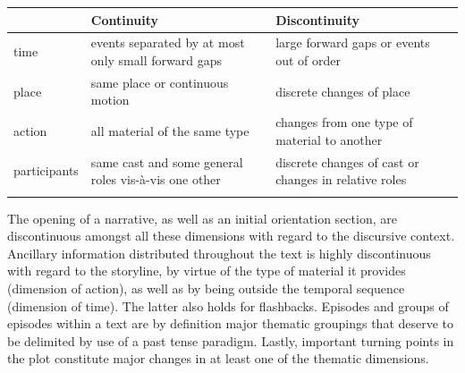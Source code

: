 \begin{table}[htb]
\begin{center}
\begin{tabularx}{\textwidth}{lXX}
\lsptoprule 
& \footnotesize{Continuity} & \footnotesize{Discontinuity}\\
\midrule
\footnotesize{time} & events separated by at most only small forward gaps & large forward gaps or events out of order\\
\footnotesize{place} & same place or continuous motion & discrete changes of place\\
\footnotesize{action} & all material of the same type & changes from one type of material to another \\
\footnotesize{participants} & same cast and some general roles vis-à-vis one other & discrete changes of cast or changes in relative roles\\
\lspbottomrule 
\end{tabularx}
\label{TableThematicContinuityDiscontinuity}
\end{center}
\end{table}

The opening of a narrative, as well as an initial orientation section, are discontinuous amongst all these dimensions with regard to the discursive context. Ancillary information distributed throughout the text is highly discontinuous with regard to the storyline, by virtue of the type of material it provides (dimension of action), as well as by being outside the temporal sequence (dimension of time). The latter also holds for flashbacks. Episodes and groups of episodes within a text are by definition major thematic groupings that deserve to be delimited by use of a past tense paradigm. Lastly, important turning points in the plot constitute major changes in at least one of the thematic dimensions.

